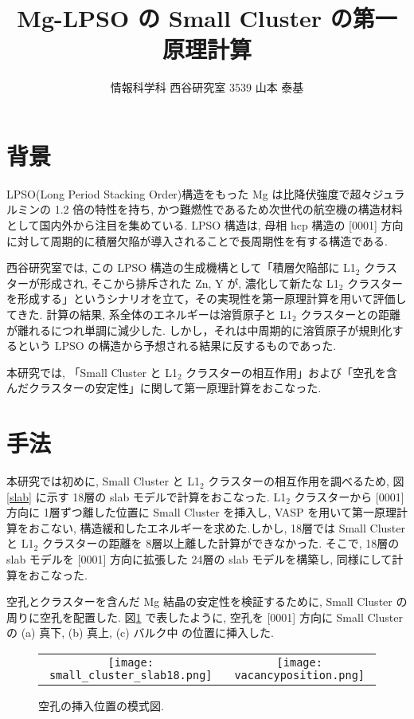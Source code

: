 \documentclass[a4j,twocolumn]{jsarticle}
\begin{document}
\title{Mg-LPSO の Small Cluster の第一原理計算}
\author{情報科学科 西谷研究室 3539 山本 泰基}
\date{}
\maketitle


\section{背景}
\vspace{-0.5em}
LPSO(Long Period Stacking Order)構造をもった Mg は比降伏強度で超々ジュラルミンの 1.2 倍の特性を持ち, かつ難燃性であるため次世代の航空機の構造材料として国内外から注目を集めている\cite{Th}. LPSO 構造は, 母相 hcp 構造の [0001] 方向に対して周期的に積層欠陥が導入されることで長周期性を有する構造である.

西谷研究室では, この LPSO 構造の生成機構として「積層欠陥部に L1$_2$ クラスターが形成され, そこから排斥された Zn, Y が, 濃化して新たな L1$_2$ クラスターを形成する」というシナリオを立て，その実現性を第一原理計算を用いて評価してきた. 計算の結果, 系全体のエネルギーは溶質原子と L1$_2$ クラスターとの距離が離れるにつれ単調に減少した. しかし，それは中周期的に溶質原子が規則化するという LPSO の構造から予想される結果に反するものであった.

本研究では, 「Small Cluster と L1$_2$ クラスターの相互作用」および「空孔を含んだクラスターの安定性」に関して第一原理計算をおこなった.

\section{手法}
\vspace{-0.5em}
本研究では初めに, Small Cluster と L1$_2$ クラスターの相互作用を調べるため, 図\ref{slab} に示す 18層の slab モデルで計算をおこなった. L1$_2$ クラスターから [0001] 方向に 1層ずつ離した位置に Small Cluster を挿入し, VASP を用いて第一原理計算をおこない, 構造緩和したエネルギーを求めた.しかし, 18層では Small Cluster と L1$_2$ クラスターの距離を 8層以上離した計算ができなかった. そこで, 18層の slab モデルを [0001] 方向に拡張した 24層の slab モデルを構築し, 同様にして計算をおこなった.

空孔とクラスターを含んだ Mg 結晶の安定性を検証するために, Small Cluster の周りに空孔を配置した. 図\ref{vacancy} で表したように, 空孔を [0001] 方向に Small Cluster の (a) 真下, (b) 真上, (c) バルク中 の位置に挿入した. 

\begin{figure}[htbp]
    \begin{tabular}{cc}
      \begin{minipage}{0.4\hsize}
        \centering
        \texttt{[image: small\_cluster\_slab18.png]}
		\caption{slab モデルの模式図.}
		\label{slab}
      \end{minipage} &
      \begin{minipage}{0.4\hsize}
        \centering
        \texttt{[image: vacancyposition.png]}
		\caption{空孔の挿入位置の模式図.}
		\label{vacancy}
      \end{minipage}
    \end{tabular}
    \vspace{-2em}
  \end{figure}
\end{document}
